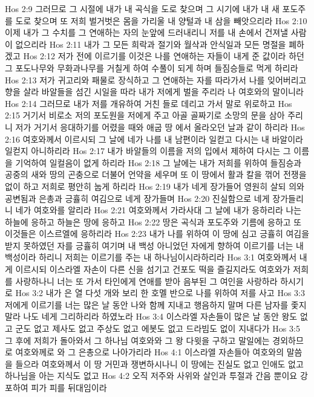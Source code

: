Hos 2:9  그러므로 그 시절에 내가 내 곡식을 도로 찾으며 그 시기에 내가 내 새 포도주를 도로 찾으며 또 저희 벌거벗은 몸을 가리울 내 양털과 내 삼을 빼앗으리라
Hos 2:10  이제 내가 그 수치를 그 연애하는 자의 눈앞에 드러내리니 저를 내 손에서 건져낼 사람이 없으리라
Hos 2:11  내가 그 모든 희락과 절기와 월삭과 안식일과 모든 명절을 폐하겠고
Hos 2:12  저가 전에 이르기를 이것은 나를 연애하는 자들이 내게 준 값이라 하던 그 포도나무와 무화과나무를 거칠게 하여 수풀이 되게 하며 들짐승들로 먹게 하리라
Hos 2:13  저가 귀고리와 패물로 장식하고 그 연애하는 자를 따라가서 나를 잊어버리고 향을 살라 바알들을 섬긴 시일을 따라 내가 저에게 벌을 주리라 나 여호와의 말이니라
Hos 2:14  그러므로 내가 저를 개유하여 거친 들로 데리고 가서 말로 위로하고
Hos 2:15  거기서 비로소 저의 포도원을 저에게 주고 아골 골짜기로 소망의 문을 삼아 주리니 저가 거기서 응대하기를 어렸을 때와 애굽 땅 에서 올라오던 날과 같이 하리라
Hos 2:16  여호와께서 이르시되 그 날에 네가 나를 내 남편이라 일컫고 다시는 내 바알이라 일컫지 아니하리라
Hos 2:17  내가 바알들의 이름을 저의 입에서 제하여 다시는 그 이름을 기억하여 일컬음이 없게 하리라
Hos 2:18  그 날에는 내가 저희를 위하여 들짐승과 공중의 새와 땅의 곤충으로 더불어 언약을 세우며 또 이 땅에서 활과 칼을 꺾어 전쟁을 없이 하고 저희로 평안히 눕게 하리라
Hos 2:19  내가 네게 장가들어 영원히 살되 의와 공변됨과 은총과 긍휼히 여김으로 네게 장가들며
Hos 2:20  진실함으로 네게 장가들리니 네가 여호와를 알리라
Hos 2:21  여호와께서 가라사대 그 날에 내가 응하리라 나는 하늘에 응하고 하늘은 땅에 응하고
Hos 2:22  땅은 곡식과 포도주와 기름에 응하고 또 이것들은 이스르엘에 응하리라
Hos 2:23  내가 나를 위하여 이 땅에 심고 긍휼히 여김을 받지 못하였던 자를 긍휼히 여기며 내 백성 아니었던 자에게 향하여 이르기를 너는 내 백성이라 하리니 저희는 이르기를 주는 내 하나님이시라하리라
Hos 3:1  여호와께서 내게 이르시되 이스라엘 자손이 다른 신을 섬기고 건포도 떡을 즐길지라도 여호와가 저희를 사랑하나니 너는 또 가서 타인에게 연애를 받아 음부된 그 여인을 사랑하라 하시기로
Hos 3:2  내가 은 열 다섯 개와 보리 한 호멜 반으로 나를 위하여 저를 사고
Hos 3:3  저에게 이르기를 너는 많은 날 동안 나와 함께 지내고 행음하지 말며 다른 남자를 좇지 말라 나도 네게 그리하리라 하였노라
Hos 3:4  이스라엘 자손들이 많은 날 동안 왕도 없고 군도 없고 제사도 없고 주상도 없고 에봇도 없고 드라빔도 없이 지내다가
Hos 3:5  그 후에 저희가 돌아와서 그 하나님 여호와와 그 왕 다윗을 구하고 말일에는 경외하므로 여호와께로 와 그 은총으로 나아가리라
Hos 4:1  이스라엘 자손들아 여호와의 말씀을 들으라 여호와께서 이 땅 거민과 쟁변하시나니 이 땅에는 진실도 없고 인애도 없고 하나님을 아는 지식도 없고
Hos 4:2  오직 저주와 사위와 살인과 투절과 간음 뿐이요 강포하여 피가 피를 뒤대임이라
